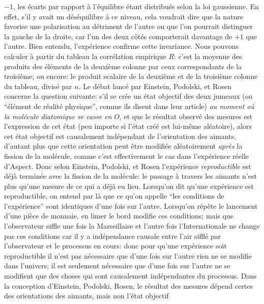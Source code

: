 $-1$, les \'ecarts par rapport \`a l'\'equilibre \'etant distribu\'es selon la 
loi gaussienne. En effet, s'il y avait un d\'es\'equilibre \`a ce niveau, cela 
voudrait dire que la nature favorise une polarisation au d\'etriment de 
l'autre ou que l'on pourrait distinguer la gauche de la droite, car l'un des 
deux c\^ot\'es comporterait davantage de $+1$ que l'autre.  
Bien entendu, l'exp\'erience confirme cette invariance.  
\medskip 
Nous pouvons calculer \`a partir du tableau la corr\'elation empirique 
$R$: c'est la moyenne des produits des \'el\'ements de la deuxi\`eme 
colonne par ceux correspondants de la troisi\`eme; ou encore: le produit 
scalaire de la deuxi\`eme et de la troisi\`eme colonne du tableau,  
divis\'e par $n$.  
\medskip 
Le d\'ebat lanc\'e par Einstein, Podolski, et Rosen concerne la question  
suivante: s'il se cr\'ee un \'etat objectif des deux jumeaux (ou 
``\'el\'ement de r\'ealit\'e physique'', comme ils disent dans leur article) 
{\it au moment o\`u la mol\'ecule diatomique se casse en} $O$, et que le 
r\'esultat observ\'e des mesures est l'expression de cet \'etat (peu  
importe si l'\'etat cr\'e\'e est lui-m\^eme al\'eatoire), alors cet \'etat 
objectif est causalement ind\'ependant de l'orientation des aimants, 
d'autant plus que cette orientation peut \^etre mo\-di\-fi\'ee al\'eatoirement 
{\it apr\`es} la fission de la mol\'ecule,  comme  c'est effectivement le 
cas dans l'exp\'erience r\'eelle d'Aspect. Donc selon Einstein, Podolski, et 
Rosen l'exp\'erience {\it reproductible} est d\'ej\`a termin\'ee avec la 
fission de  la mol\'ecule: le passage \`a travers les aimants n'est plus 
qu'une mesure de ce qui a d\'ej\`a eu lieu.  
\medskip 
Lorsqu'on dit qu'une exp\'erience est reproductible, on entend par l\`a  
 que  ce qu'on appelle ``les conditions de l'exp\'erience'' sont identiques 
d'une fois sur l'autre. Lorsqu'on r\'ep\`ete le lancement d'une pi\`ece de 
monnaie, en limer le bord modifie ces conditions; mais que 
l'observateur siffle une fois la Marseillaise et l'autre fois  
l'Internationale ne change pas ces conditions  car il y a ind\'ependance 
causale entre l'air siffl\'e par l'observateur et le processus en cours:  
donc pour qu'une exp\'erience soit reproductible il n'est pas n\'ecessaire 
que d'une fois sur l'autre rien ne se modifie dans l'univers; il est  
seulement n\'ecessaire que d'une fois sur l'autre ne se modifient que  
des choses qui sont causalement  ind\'ependantes du processus. 
\medskip 
Dans la conception d'Einstein, Podolski, Rosen, le r\'esultat des mesures 
d\'epend certes des orientations des aimants, mais non l'\'etat objectif  
